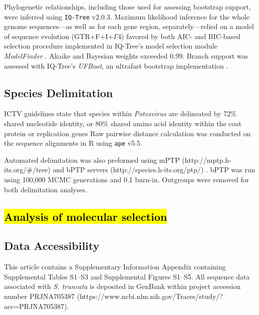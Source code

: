 \documentclass[fleqn,10pt,lineno]{wlpeerj}
\begin{document}
Phylogenetic relationships, including those used for assessing bootstrap support, were inferred using \texttt{IQ-Tree} v2.0.3. 
Maximum likelihood inference for the whole genome sequences---as well as for each gene region, separately---relied on a model of sequence evolution (GTR+F+I+$\Gamma$4) favored by both AIC- and BIC-based selection procedure implemented in IQ-Tree's model selection module {\em ModelFinder} \citep{kalyaanamoorthy2017}. 
Akaike and Bayesian weights exceeded 0.99. 
Branch support was assessed with IQ-Tree's {\em UFBoot}, an ultrafast bootstrap implementation \citep{hoang2018}.


\subsection*{Species Delimitation}
ICTV guidelines state that species within \textit{Potexvirus} are delineated by 72\% shared nucleotide identity, or 80\% shared amino acid identity within the coat protein or replication genes \citep{ICTV_potexviruses}
Raw pairwise distance calculation was conducted on the sequence alignments in R using \texttt{ape} v5.5.

Automated delimitation was also preformed using mPTP (http://mptp.h-its.org/\#/tree) \citep{Kapli_2017} and bPTP servers (http://species.h-its.org/ptp/) \citep{Zhang_2013}. 
bPTP was run using 100,000 MCMC generations and 0.1 burn-in. 
Outgroups were removed for both delimitation analyses.


\subsection*{\hl{Analysis of molecular selection}}


\subsection*{Data Accessibility}

This article contains a Supplementary Information Appendix containing Supplemental Tables S1--S3 and Supplemental Figures S1--S5. 
All sequence data associated with \textit{S. truncata} is deposited in GenBank within project accession number PRJNA705387 (https://www.ncbi.nlm.nih.gov/Traces/study/?acc=PRJNA705387).


\end{document}
